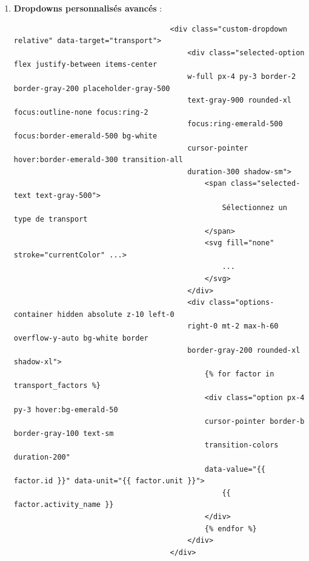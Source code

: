 \documentclass[a4paper,11pt]{article}
\begin{document}
\begin{enumerate}
                        \item \textbf{Dropdowns personnalisés avancés} :
                            \begin{tcolorbox}[colback=lightgray!6, colframe=black, left=-70mm, right=5mm, top=2mm, bottom=0mm, boxrule=0.1mm]
                                \begin{verbatim}
                                    <div class="custom-dropdown relative" data-target="transport">
                                        <div class="selected-option flex justify-between items-center 
                                        w-full px-4 py-3 border-2 border-gray-200 placeholder-gray-500 
                                        text-gray-900 rounded-xl focus:outline-none focus:ring-2 
                                        focus:ring-emerald-500 focus:border-emerald-500 bg-white 
                                        cursor-pointer hover:border-emerald-300 transition-all 
                                        duration-300 shadow-sm">
                                            <span class="selected-text text-gray-500">
                                                Sélectionnez un type de transport
                                            </span>
                                            <svg fill="none" stroke="currentColor" ...>
                                                ...
                                            </svg>
                                        </div>
                                        <div class="options-container hidden absolute z-10 left-0 
                                        right-0 mt-2 max-h-60 overflow-y-auto bg-white border 
                                        border-gray-200 rounded-xl shadow-xl">
                                            {% for factor in transport_factors %}
                                            <div class="option px-4 py-3 hover:bg-emerald-50 
                                            cursor-pointer border-b border-gray-100 text-sm 
                                            transition-colors duration-200" 
                                            data-value="{{ factor.id }}" data-unit="{{ factor.unit }}">
                                                {{ factor.activity_name }}
                                            </div>
                                            {% endfor %}
                                        </div>
                                    </div>
                                \end{verbatim}
                            \end{tcolorbox}


\end{enumerate}
\end{document}
